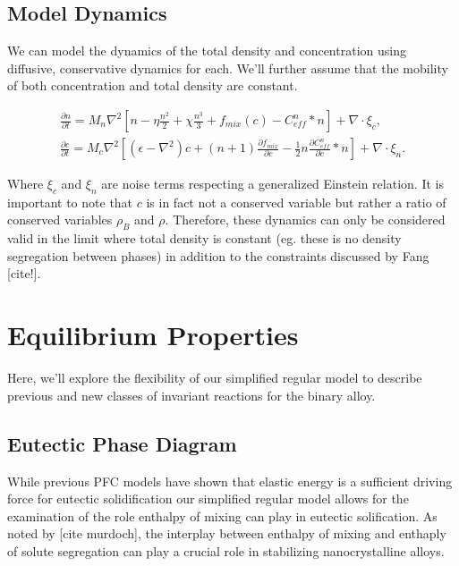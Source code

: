 \documentclass[showkeys, reprint]{revtex4-1}
\newcommand{\B}{\rho_B}
\renewcommand{\l}{\left}
\renewcommand{\r}{\right}
\newcommand{\f}{\frac}
\begin{document}
\subsection{Model Dynamics}

We can model the dynamics of the total density and concentration using diffusive, conservative dynamics for each. We'll further assume that the mobility of both concentration and total density are constant. 

\begin{gather}
	\f{\partial n}{\partial t} = M_{n} \nabla^2 \l[n - \eta \f{n^2}{2} + \chi \f{n^3}{3} + f_{mix}(c) - C^n_{eff} \ast n \r] + \nabla \cdot\xi_c, \\
	\f{\partial c}{\partial t} = M_{c} \nabla^2 \l[\l(\epsilon - \nabla^2\r)c + \l(n + 1\r)\f{\partial f_{mix}}{\partial c} - \f{1}{2} n \f{\partial C^n_{eff}}{\partial c} \ast n\r] + \nabla \cdot \xi_n.
\end{gather}

Where $\xi_c$ and $\xi_n$ are noise terms respecting a generalized Einstein relation. It is important to note that $c$ is in fact not a conserved variable but rather a ratio of conserved variables $\B$ and $\rho$. Therefore, these dynamics can only be considered valid in the limit where total density is constant (eg. these is no density segregation between phases) in addition to the constraints discussed by Fang [cite!]. 

\section{Equilibrium Properties}

Here, we'll explore the flexibility of our simplified regular model to describe previous and new classes of invariant reactions for the binary alloy.

\subsection{Eutectic Phase Diagram}

While previous PFC models have shown that elastic energy is a sufficient driving force for eutectic solidification our simplified regular model allows for the examination of the role enthalpy of mixing can play in eutectic solification. As noted by [cite murdoch], the interplay between enthalpy of mixing and enthaply of solute segregation can play a crucial role in stabilizing nanocrystalline alloys.

\end{document}
